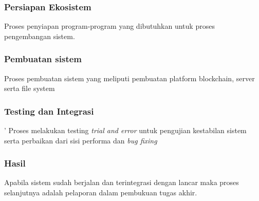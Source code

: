 \subsubsection{Persiapan Ekosistem}
Proses penyiapan program-program yang dibutuhkan untuk proses pengembangan sistem.

\subsubsection{Pembuatan sistem}
Proses pembuatan sistem yang meliputi pembuatan platform blockchain, server serta file system

\subsubsection{Testing dan Integrasi}'
Proses melakukan testing \emph{trial and error} untuk pengujian kestabilan sistem serta perbaikan dari sisi performa dan \emph{bug fixing}

\subsubsection{Hasil}
Apabila sistem sudah berjalan dan terintegrasi dengan lancar maka proses selanjutnya adalah pelaporan dalam pembukuan tugas akhir.
